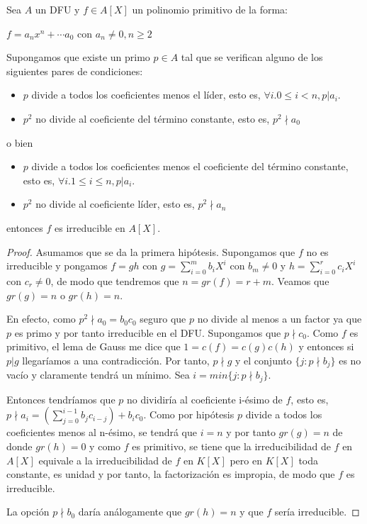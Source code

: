\begin{theorem}
Sea $A$ un DFU y $f \in A[X]$ un polinomio primitivo de la forma:

$f  = a_nx^n + \cdots a_0$ con $a_n \neq 0, n \ge 2$

Supongamos que existe un primo $p \in A$ tal que se verifican alguno de los siguientes pares de condiciones:

\begin{itemize}
\item $p$ divide a todos los coeficientes menos el líder, esto es, $\forall i. 0 \le i < n, p|a_i$.

\item $p^2$ no divide al coeficiente del término constante, esto es, $p^2 \nmid a_0$
\end{itemize}

o bien 

\begin{itemize}
\item $p$ divide a todos los coeficientes menos el coeficiente del término constante, esto es, $\forall i. 1 \le i \le n, p|a_i$. 

\item $p^2$ no divide al coeficiente líder, esto es, $p^2 \nmid a_n$
\end{itemize}

entonces $f$ es irreducible en $A[X]$.
\end{theorem}
\begin{proof}
Asumamos que se da la primera hipótesis. Supongamos que $f$ no es irreducible y pongamos $f = gh$ con $g = \sum_{i = 0}^m b_iX^i$ con $b_m \neq 0$ y $h = \sum_{i = 0}^r c_iX^i$ con $c_r \neq 0$, de modo que tendremos que $n = gr(f) = r+m$. Veamos que $gr(g) = n$ o $gr(h) = n$. 

En efecto, como $p^2 \nmid a_0 = b_0c_0$ seguro que $p$ no divide al menos a un factor ya que $p$ es primo y por tanto irreducible en el DFU. Supongamos que $p \nmid c_0$. Como $f$ es primitivo, el lema de Gauss me dice que $1 = c(f) = c(g)c(h)$ y entonces si $p | g$ llegaríamos a una contradicción. Por tanto, $p \nmid g$ y el conjunto $\{j:p \nmid b_j\}$ es no vacío y claramente tendrá un mínimo. Sea $i = min  \{j:p \nmid b_j\}$. 

Entonces tendríamos que $p$ no dividiría al coeficiente i-ésimo de $f$, esto es, $p \nmid a_i = (\sum_{j = 0}^{i-1} b_jc_{i-j}) + b_ic_0$. Como por hipótesis $p$ divide a todos los coeficientes menos al n-ésimo, se tendrá que $i = n$ y por tanto $gr(g) = n$ de donde $gr(h) = 0$ y como $f$ es primitivo, se tiene que la irreducibilidad de $f$ en $A[X]$ equivale a la irreducibilidad de $f$ en $K[X]$ pero en $K[X]$ toda constante, es unidad y por tanto, la factorización es impropia, de modo que $f$ es irreducible. 

La opción $p \nmid b_0$ daría análogamente que $gr(h) = n$ y que $f$ sería irreducible. 
\end{proof}

